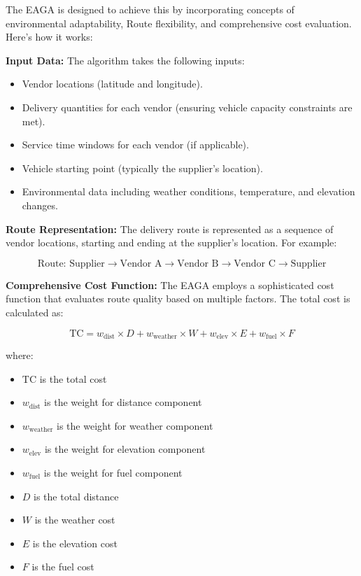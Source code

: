 The EAGA is designed to achieve this by incorporating concepts of environmental adaptability, Route flexibility, and comprehensive cost evaluation. Here's how it works:

\textbf{Input Data:}
The algorithm takes the following inputs:
\begin{itemize}
    \item Vendor locations (latitude and longitude).
    \item Delivery quantities for each vendor (ensuring vehicle capacity constraints are met).
    \item Service time windows for each vendor (if applicable).
    \item Vehicle starting point (typically the supplier's location).
    \item Environmental data including weather conditions, temperature, and elevation changes.
\end{itemize}

\textbf{Route Representation:}
The delivery route is represented as a sequence of vendor locations, starting and ending at the supplier's location. For example:

\[
    \text{Route: Supplier} \rightarrow \text{Vendor A} \rightarrow \text{Vendor B} \rightarrow \text{Vendor C} \rightarrow \text{Supplier}
\]

\textbf{Comprehensive Cost Function:}
The EAGA employs a sophisticated cost function that evaluates route quality based on multiple factors. The total cost is calculated as:

\begin{equation}
    \text{TC} = w_{\text{dist}} \times D + w_{\text{weather}} \times W + w_{\text{elev}} \times E + w_{\text{fuel}} \times F
\end{equation}

\noindent where:
\begin{itemize}
    \item $\text{TC}$ is the total cost
    \item $w_{\text{dist}}$ is the weight for distance component
    \item $w_{\text{weather}}$ is the weight for weather component
    \item $w_{\text{elev}}$ is the weight for elevation component
    \item $w_{\text{fuel}}$ is the weight for fuel component
    \item $D$ is the total distance
    \item $W$ is the weather cost
    \item $E$ is the elevation cost
    \item $F$ is the fuel cost
\end{itemize}

